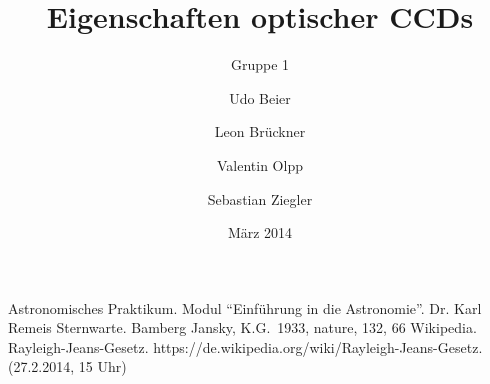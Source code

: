 
%
%


\title{Eigenschaften optischer CCDs}
\subtitle{Gruppe 1}
\date{März 2014}
\author{Udo Beier \and Leon Brückner \and Valentin Olpp \and Sebastian Ziegler}

\maketitle
\tableofcontents
\newpage
\listoffigures
\listoftables
\newpage
%
\newpage



%
%

%
\newpage
%
%
%
\begin{thebibliography}{9}
 Astronomisches Praktikum. Modul \enquote{Einführung in die Astronomie}. Dr. Karl Remeis Sternwarte. Bamberg
 Jansky, K.G.\ 1933, nature, 132, 66 
 Wikipedia. Rayleigh-Jeans-Gesetz. https://de.wikipedia.org/wiki/Rayleigh-Jeans-Gesetz. (27.2.2014, 15 Uhr)
\end{thebibliography}
